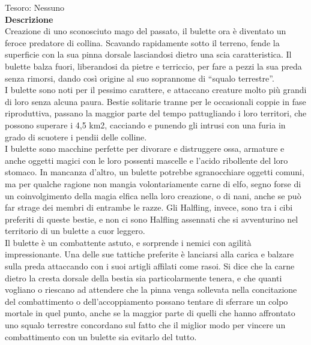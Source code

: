 \begin{multicols}{2}
Tesoro: Nessuno\\
\textbf{Descrizione}\\
Creazione di uno sconosciuto mago del passato, il bulette ora è diventato un feroce predatore di collina. Scavando rapidamente sotto il terreno, fende la superficie con la sua pinna dorsale lasciandosi dietro una scia caratteristica. Il bulette balza fuori, liberandosi da pietre e terriccio, per fare a pezzi la sua preda senza rimorsi, dando così origine al suo soprannome di “squalo terrestre”.\\
I bulette sono noti per il pessimo carattere, e attaccano creature molto più grandi di loro senza alcuna paura. Bestie solitarie tranne per le occasionali coppie in fase riproduttiva, passano la maggior parte del tempo pattugliando i loro territori, che possono superare i 4,5 km2, cacciando e punendo gli intrusi con una furia in grado di scuotere i pendii delle colline.\\
I bulette sono macchine perfette per divorare e distruggere ossa, armature e anche oggetti magici con le loro possenti mascelle e l'acido ribollente del loro stomaco. In mancanza d'altro, un bulette potrebbe sgranocchiare oggetti comuni, ma per qualche ragione non mangia volontariamente carne di elfo, segno forse di un coinvolgimento della magia elfica nella loro creazione, o di nani, anche se può far strage dei membri di entrambe le razze. Gli Halfling, invece, sono tra i cibi preferiti di queste bestie, e non ci sono Halfling assennati che si avventurino nel territorio di un bulette a cuor leggero.\\
Il bulette è un combattente astuto, e sorprende i nemici con agilità impressionante. Una delle sue tattiche preferite è lanciarsi alla carica e balzare sulla preda attaccando con i suoi artigli affilati come rasoi. Si dice che la carne dietro la cresta dorsale della bestia sia particolarmente tenera, e che quanti vogliano o riescano ad attendere che la pinna venga sollevata nella concitazione del combattimento o dell'accoppiamento possano tentare di sferrare un colpo mortale in quel punto, anche se la maggior parte di quelli che hanno affrontato uno squalo terrestre concordano sul fatto che il miglior modo per vincere un combattimento con un bulette sia evitarlo del tutto.\\


\end{multicols}
